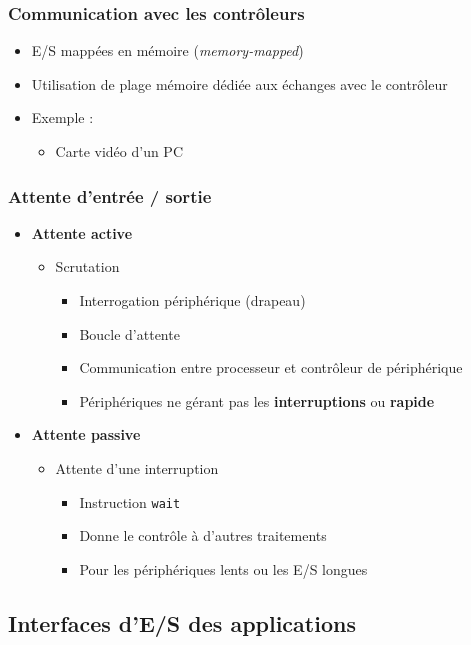 \begin{frame}
\frametitle{Communication avec les contrôleurs}
\begin{itemize}
\item E/S mappées en mémoire (\textit{memory-mapped})
\item Utilisation de plage mémoire dédiée aux échanges avec le contrôleur
\item Exemple :
\begin{itemize}
\item Carte vidéo d'un PC
\end{itemize}
\end{itemize}
\end{frame}

\begin{frame}
\frametitle{Attente d’entrée / sortie}
\begin{itemize}
\item \textbf{Attente active}
\begin{itemize}
\item Scrutation
\begin{itemize}
\item Interrogation périphérique (drapeau)
\item Boucle d’attente
\item Communication entre processeur et contrôleur de périphérique
\item Périphériques ne gérant pas les \textbf{interruptions} ou \textbf{rapide}
\end{itemize}
\end{itemize}
\item \textbf{Attente passive}
\begin{itemize}
\item Attente d'une interruption
\begin{itemize}
\item Instruction \texttt{wait}
\item Donne le contrôle à d’autres traitements
\item Pour les périphériques lents ou les E/S longues
\end{itemize}
\end{itemize}
\end{itemize}
\end{frame}


\subsection{Interfaces d'E/S des applications}

